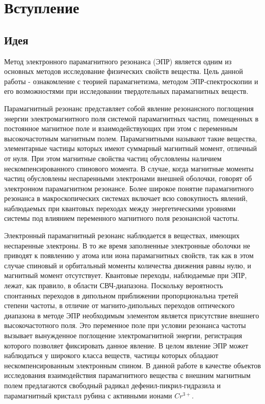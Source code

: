 



\def\labauthors{Войтович Д.А., Карусевич А.А., Разова А.А.}
\def\labgroup{440}
\def\labnumber{1}
\def\labtheme{Исследование твердотельных структур методом ЭПР-спектроскопии}
\renewcommand{\vec}{\mathbf}
\renewcommand{\Re}{\operatorname{Re}}
\renewcommand{\Im}{\operatorname{Im}}
\renewcommand{\phi}{\varphi}
\renewcommand{\hat}{\widehat}



\section{Вступление}
\subsection*{Идея}
Метод электронного парамагнитного резонанса (ЭПР) является одним из основных методов исследование физических свойств вещества. Цель данной работы - ознакомление с теорией парамагнетизма, методом ЭПР-спектроскопии и его возможностями при исследовании твердотельных парамагнитных веществ. 

Парамагнитный резонанс представляет собой явление резонансного поглощения энергии электромагнитного поля системой парамагнитных частиц, помещенных в постоянное магнитное поле и взаимодействующих при этом с переменным высокочастотным магнитным полем. Парамагнитными называют такие вещества, элементарные частицы которых имеют суммарный магнитный момент, отличный от нуля. При этом магнитные свойства частиц обусловлены наличием нескомпенсированного спинового момента. В случае, когда магнитные моменты частиц обусловлены неспаренными электронами внешней оболочки, говорят об электронном парамагнитном резонансе. Более широкое понятие парамагнитного резонанса в макроскопических системах включает всю совокупность явлений, наблюдаемых при квантовых переходах между энергетическими уровнями системы под влиянием переменного магнитного поля резонансной частоты. 

Электронный парамагнитный резонанс наблюдается в веществах, имеющих неспаренные электроны. В то же время заполненные электронные оболочки не приводят к появлению у атома или иона парамагнитных свойств, так как в этом случае спиновый и орбитальный моменты количества движения равны нулю, и магнитный момент отсутствует. Квантовые переходы, наблюдаемые при ЭПР, лежат, как правило, в области СВЧ-диапазона. Поскольку вероятность спонтанных переходов в дипольном приближении пропорциональна третей степени частоты, в отличие от магнито-дипольных переходов оптического диапазона в методе ЭПР необходимым элементом является присутствие внешнего высокочастотного поля. Это переменное поле при условии резонанса частоты вызывает вынужденное поглощение электромагнитной энергии, регистрация которого позволяет фиксировать данное явление. В целом явление ЭПР может наблюдаться у широкого класса веществ, частицы которых обладают нескомпенсированным электронным спином. В данной работе в качестве объектов исследования взаимодействия парамагнитного вещества с внешним магнитным полем предлагаются свободный радикал дефенил-пикрил-гидразила и парамагнитный кристалл рубина с активными ионами $Cr^{3+}$.

